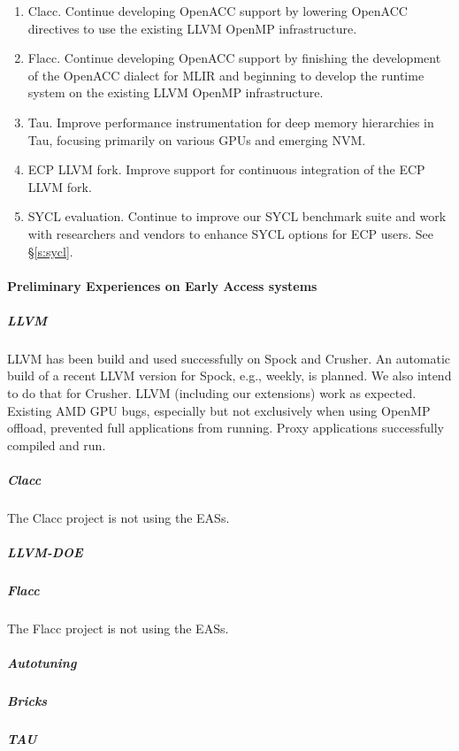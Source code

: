 \begin{enumerate}
	\item Clacc. Continue developing OpenACC support by lowering OpenACC directives to use the existing LLVM OpenMP infrastructure.
    
    \item Flacc. Continue developing OpenACC support by finishing the development of the  OpenACC dialect for MLIR and beginning to develop the runtime system on the existing LLVM OpenMP infrastructure.
    
    \item Tau. Improve performance instrumentation for deep memory hierarchies in Tau, focusing primarily on various GPUs and emerging NVM.
    
    \item ECP LLVM fork. Improve support for continuous integration of the ECP LLVM fork.

    \item SYCL evaluation. 
    Continue to improve our SYCL benchmark suite and work with researchers and vendors to enhance SYCL options for ECP users. See \S\ref{s:sycl}.

\end{enumerate}


\paragraph{Preliminary Experiences on Early Access systems}

\subparagraph{LLVM}

LLVM has been build and used successfully on Spock and Crusher.
An automatic build of a recent LLVM version for Spock, e.g., weekly, is
planned. We also intend to do that for Crusher. LLVM (including our 
extensions) work as expected. Existing AMD GPU bugs, especially but not exclusively 
when using OpenMP offload, prevented full applications from running.
Proxy applications successfully compiled and run.

\subparagraph{Clacc}

The Clacc project is not using the EASs. 

\subparagraph{LLVM-DOE}

\subparagraph{Flacc}

The Flacc project is not using the EASs. 

\subparagraph{Autotuning}

\subparagraph{Bricks}

\subparagraph{TAU}

